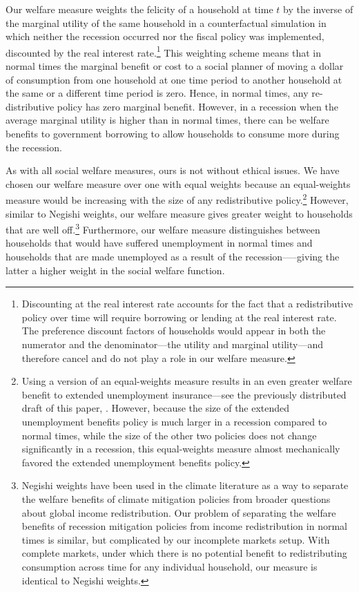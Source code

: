 \documentclass[\econtexRoot/HAFiscal]{subfiles}
\begin{document}
Our welfare measure weights the felicity of a household at time $t$ by the inverse of the marginal utility of the same household in a counterfactual simulation in which neither the recession occurred nor the fiscal policy was implemented, discounted by the real interest rate.\footnote{Discounting at the real interest rate accounts for the fact that a redistributive policy over time will require borrowing or lending at the real interest rate.
The preference discount factors of households would appear in both the numerator and the denominator---the utility and marginal utility---and therefore cancel and do not play a role in our welfare measure.} This weighting scheme means that in normal times the marginal benefit or cost to a social planner of moving a dollar of consumption from one household at one time period to another household at the same or a different time period is zero.
Hence, in normal times, any re-distributive policy has zero marginal benefit.
However, in a recession when the average marginal utility is higher than in normal times, there can be welfare benefits to government borrowing to allow households to consume more during the recession.

As with all social welfare measures, ours is not without ethical issues.  We have chosen our welfare measure over one with equal weights because an equal-weights measure would be increasing with the size of any redistributive policy.\footnote{Using a version of an equal-weights measure results in an even greater welfare benefit to extended unemployment insurance---see the previously distributed draft of this paper, \cite{carroll2023welfare}.  However, because the size of the extended unemployment benefits policy is much larger in a recession compared to normal times, while the size of the other two policies does not change significantly in a recession, this equal-weights measure almost mechanically favored the extended unemployment benefits policy.}  However, similar to Negishi weights, our welfare measure gives greater weight to households that are well off.\footnote{Negishi weights have been used in the climate literature as a way to separate the welfare benefits of climate mitigation policies from broader questions about global income redistribution. Our problem of separating the welfare benefits of recession mitigation policies from income redistribution in normal times is similar, but complicated by our incomplete markets setup. With complete markets, under which there is no potential benefit to redistributing consumption across time for any individual household, our measure is identical to Negishi weights.}  Furthermore, our welfare measure distinguishes between households that would have suffered unemployment in normal times and households that are made unemployed as a result of the recession—--giving the latter a higher weight in the social welfare function.
\end{document}
